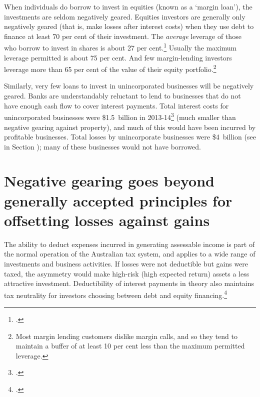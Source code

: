 \documentclass{grattanAlpha}\usepackage[]{graphicx}\usepackage[]{color}
\begin{document}
When individuals do borrow to invest in equities (known as a ‘margin loan’), the investments are seldom negatively geared. Equities investors are generally only negatively geared (that is, make losses after interest costs) when they use debt to finance at least 70 per cent of their investment.  The \emph{average} leverage of those who borrow to invest in shares is about 27 per cent.\footcite[][Table~D2]{RBA2015StatsMarginLending} Usually the maximum leverage permitted is about 75 per cent. And few margin-lending investors leverage more than 65 per cent of the value of their equity portfolio.\footnote{Most margin lending customers dislike margin calls, and so they tend to maintain a buffer of at least 10 per cent less than the maximum permitted leverage.}

Similarly, very few loans to invest in unincorporated businesses will be negatively geared. Banks are understandably reluctant to lend to businesses that do not have enough cash flow to cover interest payments. Total interest costs for unincorporated businesses were \$1.5~billion in 2013-14\footcite{ATOTaxstats201314} (much smaller than negative gearing against property), and much of this would have been incurred by profitable businesses. Total losses by unincorporate businesses were \$4~billion (see \pageref{insec:number-taxpayers-claiming-business-losses} in Section ); many of these businesses would not have borrowed. 

\section{Negative gearing goes beyond generally accepted principles for offsetting losses against gains}\label{sec:NG-goes-beyond-accepted-principles-for-offsetting-losses}
The ability to deduct expenses incurred in generating assessable income is part of the normal operation of the Australian tax system, and applies to a wide range of investments and business activities. If losses were not deductible but gains were taxed, the asymmetry would make high-risk (high expected return) assets a less attractive investment. Deductibility of interest payments in theory also maintains tax neutrality for investors choosing between debt and equity financing.\footcite{FaneRichardson2004}   
\end{document}
